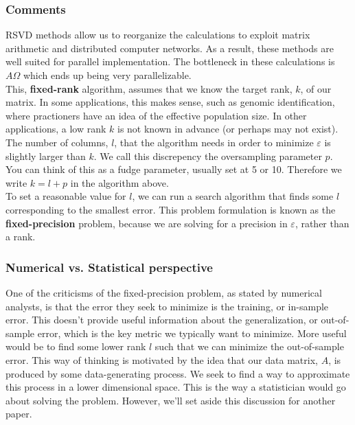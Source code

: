 \documentclass{article}
\begin{document}
\subsubsection{Comments}

RSVD methods allow us to reorganize the calculations to exploit matrix arithmetic and distributed computer networks. As a result, these methods are well suited for parallel implementation. The bottleneck in these calculations is $A\Omega$ which ends up being very parallelizable.
\\

This, \textbf{fixed-rank} algorithm, assumes that we know the target rank, $k$, of our matrix. In some applications, this makes sense, such as genomic identification, where practioners have an idea of the effective population size. In other applications, a low rank $k$ is not known in advance (or perhaps may not exist). The number of columns, $l$, that the algorithm needs in order to minimize $\varepsilon$ is slightly larger than $k$. We call this discrepency the oversampling parameter $p$. You can think of this as a fudge parameter, usually set at 5 or 10. Therefore we write $k = l + p$ in the algorithm above.
\\

To set a reasonable value for $l$, we can run a search algorithm that finds some $l$ corresponding to the smallest error. This problem formulation is known as the \textbf{fixed-precision} problem, because we are solving for a precision in $\varepsilon$, rather than a rank.
\\

\subsubsection{Numerical vs. Statistical perspective}

One of the criticisms of the fixed-precision problem, as stated by numerical analysts, is that the error they seek to minimize is the training, or in-sample error. This doesn't provide useful information about the generalization, or out-of-sample error, which is the key metric we typically want to minimize. More useful would be to find some lower rank $l$ such that we can minimize the out-of-sample error. This way of thinking is motivated by the idea that our data matrix, $A$, is produced by some data-generating process. We seek to find a way to approximate this process in a lower dimensional space. This is the way a statistician would go about solving the problem. However, we'll set aside this discussion for another paper.
\end{document}
